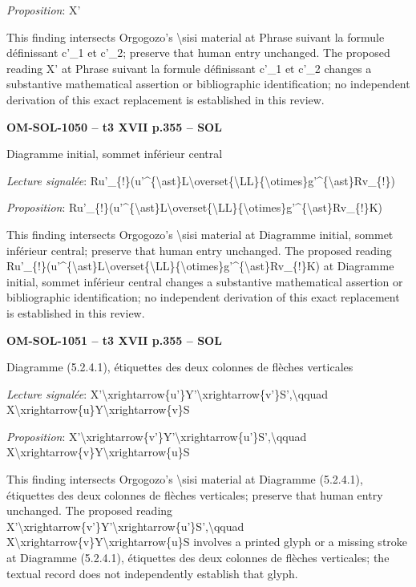 \emph{Proposition}: X'\par
This finding intersects Orgogozo's \textbackslash{}sisi material at Phrase suivant la formule définissant c'\_1 et c'\_2; preserve that human entry unchanged. The proposed reading X' at Phrase suivant la formule définissant c'\_1 et c'\_2 changes a substantive mathematical assertion or bibliographic identification; no independent derivation of this exact replacement is established in this review.\par
\par\noindent\textbf{OM-SOL-1050 -- t3 XVII p.355 -- SOL}\par
Diagramme initial, sommet inférieur central\par
\emph{Lecture signalée}: Ru'\_\{!\}(u'\textasciicircum{}\{\textbackslash{}ast\}L\textbackslash{}overset\{\textbackslash{}LL\}\{\textbackslash{}otimes\}g'\textasciicircum{}\{\textbackslash{}ast\}Rv\_\{!\})\par
\emph{Proposition}: Ru'\_\{!\}(u'\textasciicircum{}\{\textbackslash{}ast\}L\textbackslash{}overset\{\textbackslash{}LL\}\{\textbackslash{}otimes\}g'\textasciicircum{}\{\textbackslash{}ast\}Rv\_\{!\}K)\par
This finding intersects Orgogozo's \textbackslash{}sisi material at Diagramme initial, sommet inférieur central; preserve that human entry unchanged. The proposed reading Ru'\_\{!\}(u'\textasciicircum{}\{\textbackslash{}ast\}L\textbackslash{}overset\{\textbackslash{}LL\}\{\textbackslash{}otimes\}g'\textasciicircum{}\{\textbackslash{}ast\}Rv\_\{!\}K) at Diagramme initial, sommet inférieur central changes a substantive mathematical assertion or bibliographic identification; no independent derivation of this exact replacement is established in this review.\par
\par\noindent\textbf{OM-SOL-1051 -- t3 XVII p.355 -- SOL}\par
Diagramme (5.2.4.1), étiquettes des deux colonnes de flèches verticales\par
\emph{Lecture signalée}: X'\textbackslash{}xrightarrow\{u'\}Y'\textbackslash{}xrightarrow\{v'\}S',\textbackslash{}qquad X\textbackslash{}xrightarrow\{u\}Y\textbackslash{}xrightarrow\{v\}S\par
\emph{Proposition}: X'\textbackslash{}xrightarrow\{v'\}Y'\textbackslash{}xrightarrow\{u'\}S',\textbackslash{}qquad X\textbackslash{}xrightarrow\{v\}Y\textbackslash{}xrightarrow\{u\}S\par
This finding intersects Orgogozo's \textbackslash{}sisi material at Diagramme (5.2.4.1), étiquettes des deux colonnes de flèches verticales; preserve that human entry unchanged. The proposed reading X'\textbackslash{}xrightarrow\{v'\}Y'\textbackslash{}xrightarrow\{u'\}S',\textbackslash{}qquad X\textbackslash{}xrightarrow\{v\}Y\textbackslash{}xrightarrow\{u\}S involves a printed glyph or a missing stroke at Diagramme (5.2.4.1), étiquettes des deux colonnes de flèches verticales; the textual record does not independently establish that glyph.\par
